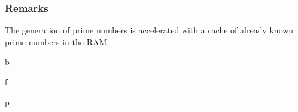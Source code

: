\documentclass[letterpaper,10pt,english]{sphinxhowto}
\begin{document}
\subsubsection{Remarks}
\label{\detokenize{prime:remarks}}
The generation of prime numbers is accelerated with a cache of already known prime numbers in the RAM.


\renewcommand{\indexname}{Python Module Index}
\begin{sphinxtheindex}
\def\bigletter#1{{\Large\sffamily#1}\nopagebreak\vspace{1mm}}
\bigletter{b}
\item {}
\indexspace
\bigletter{f}
\item {}
\indexspace
\bigletter{p}
\item {}
\end{sphinxtheindex}

\renewcommand{\indexname}{Index}
\printindex
\end{document}
